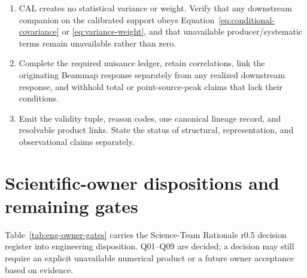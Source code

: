 \documentclass[10pt]{article}
\begin{document}
\begin{enumerate}[label=\textbf{E\arabic*.},leftmargin=*]
\item {} CAL creates no statistical
  variance or weight. Verify that any downstream companion on the calibrated
  support obeys Equation~\eqref{eq:conditional-covariance} or
  \eqref{eq:variance-weight}, and that unavailable producer/systematic terms
  remain unavailable rather than zero.

\item {} Complete the required
  nuisance ledger, retain correlations, link the originating Beammap response
  separately from any realized downstream response, and withhold total or
  point-source-peak claims that lack their conditions.

\item {} Emit the validity tuple, reason
  codes, one canonical lineage record, and resolvable product links. State the
  status of structural, representation, and observational claims separately.
\end{enumerate}

\section{Scientific-owner dispositions and remaining gates}
\label{sec:eng-owner-gates}

Table~\ref{tab:eng-owner-gates} carries the Science-Team Rationale r0.5
decision register into engineering disposition. Q01--Q09 are decided; a
decision may still require an explicit unavailable numerical product or a
future owner acceptance based on evidence.
\end{document}
